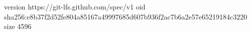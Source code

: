 version https://git-lfs.github.com/spec/v1
oid sha256:e8b37f2d52fe804a85167a49997685d607b936f2ac7b6a2e57e65219184c3220
size 4596
